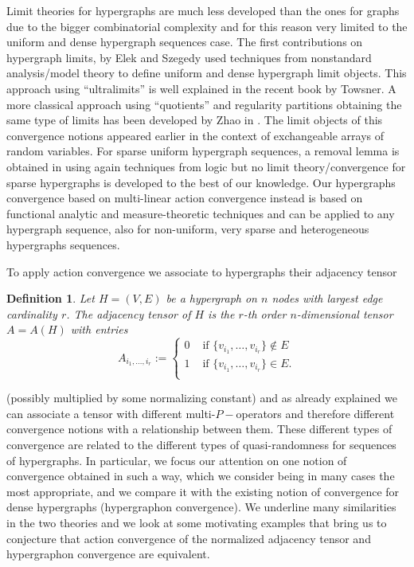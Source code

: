 \documentclass[11pt]{article}
\newtheorem{definition}[theorem]{Definition}
\begin{document}
Limit theories for hypergraphs are much less developed than the ones for graphs due to the bigger combinatorial complexity and for this reason very limited to the uniform and dense hypergraph sequences case. The first contributions on hypergraph limits,\cite{hypergrELEK20121731,HypergraphsSzegedy2} by Elek and Szegedy used techniques from nonstandard analysis/model theory to define uniform and dense hypergraph limit objects. This approach using “ultralimits” is well explained in the recent book \cite{RandomneLimitTow} by Towsner. A more classical approach using “quotients” and regularity partitions obtaining the same type of limits has been developed by Zhao in  \cite{HypergraphonsZhao}. The limit objects of this convergence notions appeared earlier in the context of exchangeable arrays of random variables\cite{kallenberg1992symmetries, hoover1979relations, aldous1981representations, aldous2010exchangeability,austin2008exchangeable,diaconis2007graph}. For sparse uniform hypergraph sequences, a removal lemma is obtained in \cite{SparseHypLogicLimit} using again techniques from logic but no limit theory/convergence for sparse hypergraphs is developed to the best of our knowledge. Our hypergraphs convergence based on multi-linear action convergence instead is based on functional analytic and measure-theoretic techniques and can be applied to any hypergraph sequence, also for non-uniform, very sparse and heterogeneous hypergraphs sequences. 

To apply action convergence we associate to hypergraphs their adjacency tensor

\begin{definition}
Let $H=(V,E)$ be a hypergraph on $n$ nodes with largest edge cardinality $r$. The \emph{adjacency tensor} of $H$ is the $r$-th order $n$-dimensional tensor $A=A(H)$ with entries
\begin{equation*}
A_{i_1,\ldots,i_r}:=\begin{cases}
0 & \text{ if }\{v_{i_1},\ldots,v_{i_r}\}\notin E\\
1 &  \text{ if }\{v_{i_1},\ldots,v_{i_r}\}\in E.\\
\end{cases}
\end{equation*}
\end{definition}

(possibly multiplied by some normalizing constant) and as already explained we can associate a tensor with different multi-$P-$operators and therefore different convergence notions with a relationship between them. These different types of convergence are related to the different types of quasi-randomness for sequences of hypergraphs. In particular, we focus our attention on one notion of convergence obtained in such a way, which we consider being in many cases the most appropriate, and we compare it with the existing notion of convergence for dense hypergraphs (hypergraphon convergence). We underline many similarities in the two theories and we look at some motivating examples that bring us to conjecture that action convergence of the normalized adjacency tensor and hypergraphon convergence are equivalent. 
\end{document}
